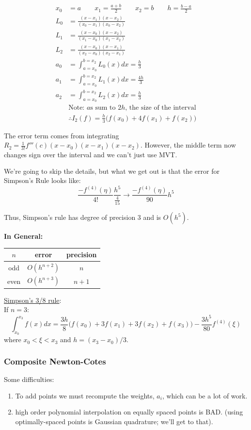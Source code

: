 \documentclass[12pt]{article}
\begin{document}
\begin{align}
x_0 &= a \qquad x_1 = \frac{a+b}{2} \qquad x_2=b \qquad h=\frac{b-a}{2}\\
%
L_0 &= \frac{(x-x_1)(x-x_2)}{(x_0-x_1)(x_0-x_2)}\\
L_1 &= \frac{(x-x_0)(x-x_2)}{(x_1-x_0)(x_1-x_2)}\\
L_2 &= \frac{(x-x_0)(x-x_1)}{(x_2-x_0)(x_2-x_1)}\\
%
a_0 &= \int_{a=x_0}^{b=x_2} L_0(x)dx = \frac{h}{3}\\
a_1 &= \int_{a=x_0}^{b=x_2} L_1(x)dx = \frac{4h}{3}\\
a_2 &= \int_{a=x_0}^{b=x_2} L_2(x)dx = \frac{h}{3}\\
&\text{Note: $a$s sum to }2h\text{, the size of the interval}\nonumber\\
%
&\therefore I_2(f) = \frac{h}{3}\bigl(f(x_0) + 4f(x_1) + f(x_2)\bigr) \end{align}
 
The error term comes from integrating $R_2 = \frac{1}{3!}f'''(c)(x-x_0)(x-x_1)(x-x_2)$. However, the middle term now changes sign over the interval and we can't just use MVT.

We're going to skip the details, but what we get out is that the error for Simpson's Rule looks like:
\[\frac{-f^{(4)}(\eta)}{4!}\frac{h^5}{\frac{4}{15}} \rightarrow \boxed{\frac{-f^{(4)}(\eta)}{90}h^5}\]

Thus, Simpson's rule has degree of precision 3 and is $O(h^5)$.

\vspace*{2em}
\textbf{In General:}
\begin{center}
\begin{tabular}{c c c}
$n$  & error        & precision \\ \hline
odd  & $O(h^{n+2})$ & $n$ \\
even & $O(h^{n+3})$ & $n+1$ \\
\end{tabular}
\end{center}

\underline{Simpson's 3/8 rule}:\\
If $n=3$:
\[\int_{x_0}^{x_3} f(x)dx = \frac{3h}{8}\bigl(f(x_0) + 3f(x_1) + 3f(x_2) + f(x_3)\bigr) - \frac{3h^5}{80}f^{(4)}(\xi)\]
where $x_0 < \xi < x_3$ and $h=(x_3 - x_0)/3$.

\subsubsection{Composite Newton-Cotes}
Some difficulties:
\begin{enumerate}
\item To add points we must recompute the weights, $a_i$, which can be a lot of work.
\item high order polynomial interpolation on equally spaced points is BAD. (using optimally-spaced points is Gaussian quadrature; we'll get to that).
\end{enumerate}
\end{document}
